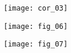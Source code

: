 \begin{multicols}{2}
\begin{corrige}
\begin{center}
\texttt{[image: cor\_03]}
\end{center}
 
\end{corrige}
\else
\fi


\ifprof
\else
\begin{center}
\texttt{[image: fig\_06]}
\end{center}

\begin{center}
\texttt{[image: fig\_07]}
\end{center}
\fi

\ifprof
\else
\end{multicols}
\fi



%
%
%
%
%
%
%
%
%
%
%

